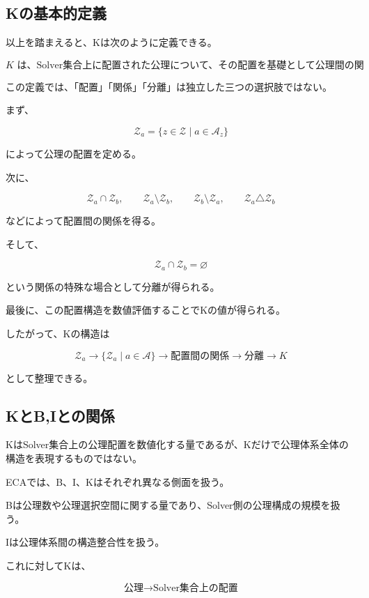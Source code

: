 \subsection{Kの基本的定義}

以上を踏まえると、Kは次のように定義できる。

\[
\boxed{
K\text{ は、Solver集合上に配置された公理について、その配置を基礎として公理間の関係および分離の構造を記述し、それを数値化する量である。}
}
\]

この定義では、「配置」「関係」「分離」は独立した三つの選択肢ではない。

まず、

\[
\mathcal{Z}_a = \{z\in\mathcal{Z}\mid a\in\mathcal{A}_z\}
\]

によって公理の配置を定める。

次に、

\[
\mathcal{Z}_a\cap\mathcal{Z}_b,
\qquad
\mathcal{Z}_a\setminus\mathcal{Z}_b,
\qquad
\mathcal{Z}_b\setminus\mathcal{Z}_a,
\qquad
\mathcal{Z}_a\triangle\mathcal{Z}_b
\]

などによって配置間の関係を得る。

そして、

\[
\mathcal{Z}_a\cap\mathcal{Z}_b=\varnothing
\]

という関係の特殊な場合として分離が得られる。

最後に、この配置構造を数値評価することでKの値が得られる。

したがって、Kの構造は

\[
\boxed{
\mathcal{Z}_a
\longrightarrow
\{\mathcal{Z}_a\mid a\in\mathcal{A}\}
\longrightarrow
\text{配置間の関係}
\longrightarrow
\text{分離}
\longrightarrow
K
}
\]

として整理できる。

\subsection{KとB,Iとの関係}

KはSolver集合上の公理配置を数値化する量であるが、Kだけで公理体系全体の構造を表現するものではない。

ECAでは、B、I、Kはそれぞれ異なる側面を扱う。

Bは公理数や公理選択空間に関する量であり、Solver側の公理構成の規模を扱う。

Iは公理体系間の構造整合性を扱う。

これに対してKは、

\[
\text{公理}
\longrightarrow
\text{Solver集合上の配置}
\]

